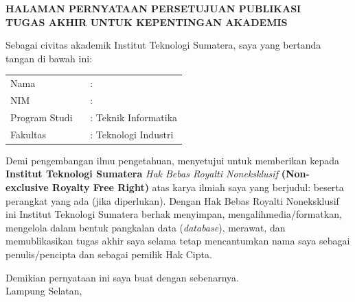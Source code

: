 \clearpage
{}%

\begin{center}
	\smallskip

	\normalsize \bfseries \MakeUppercase{
		HALAMAN PERNYATAAN PERSETUJUAN PUBLIKASI \\
		TUGAS AKHIR UNTUK KEPENTINGAN AKADEMIS
	}\linebreak

	\normalfont \onehalfspacing \justifying %
	\hspace{0.7cm}
	\begin{flushleft}
		Sebagai civitas akademik Institut Teknologi Sumatera, saya yang bertanda tangan di bawah ini:
	\end{flushleft}

	\flushleft
	\setlength{\tabcolsep}{0pt}
	\begin{tabular}{l l}
		Nama             & : \theauthor         \\
		NIM              & : \printnim          \\
		Program Studi \	 & : Teknik Informatika \\
		Fakultas         & : Teknologi Industri \\
	\end{tabular}
	\bigskip

	\justifying
	\noindent Demi pengembangan ilmu pengetahuan, menyetujui untuk memberikan kepada \textbf{Institut Teknologi Sumatera }\textit{Hak Bebas Royalti Noneksklusif} \textbf{(Non-exclusive Royalty Free Right)} atas karya ilmiah saya yang berjudul:\textbf{\thetitle} beserta perangkat yang ada (jika diperlukan). Dengan Hak Bebas Royalti Noneksklusif ini Institut Teknologi Sumatera berhak menyimpan, mengalihmedia/formatkan, mengelola dalam bentuk pangkalan data (\textit{database}), merawat, dan memublikasikan tugas akhir saya selama tetap mencantumkan nama saya sebagai penulis/pencipta dan sebagai pemilik Hak Cipta.
	\bigskip

	\noindent Demikian pernyataan ini saya buat dengan sebenarnya. \\

	\centering
	Lampung Selatan, \todayIndo\\
	\bigskip
	\vspace{1.5cm}
	\theauthor \\
	\printnim \\

\end{center}
\clearpage
